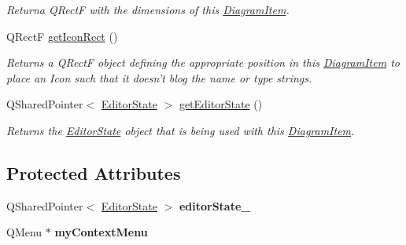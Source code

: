 \begin{DoxyCompactItemize}
\begin{DoxyCompactList}\small\item\em Returna Q\-Rect\-F with the dimensions of this \hyperlink{class_diagram_item}{Diagram\-Item}. \end{DoxyCompactList}\item 
\hypertarget{class_diagram_item_aa1244f4c5fc573505096ce8384580396}{Q\-Rect\-F \hyperlink{class_diagram_item_aa1244f4c5fc573505096ce8384580396}{get\-Icon\-Rect} ()}\label{class_diagram_item_aa1244f4c5fc573505096ce8384580396}

\begin{DoxyCompactList}\small\item\em Returns a Q\-Rect\-F object defining the appropriate position in this \hyperlink{class_diagram_item}{Diagram\-Item} to place an Icon such that it doesn't blog the name or type strings. \end{DoxyCompactList}\item 
\hypertarget{class_diagram_item_afe6a5812a322d49ea7da56bfccdc98dc}{Q\-Shared\-Pointer$<$ \hyperlink{class_editor_state}{Editor\-State} $>$ \hyperlink{class_diagram_item_afe6a5812a322d49ea7da56bfccdc98dc}{get\-Editor\-State} ()}\label{class_diagram_item_afe6a5812a322d49ea7da56bfccdc98dc}

\begin{DoxyCompactList}\small\item\em Returns the \hyperlink{class_editor_state}{Editor\-State} object that is being used with this \hyperlink{class_diagram_item}{Diagram\-Item}. \end{DoxyCompactList}\end{DoxyCompactItemize}
\subsection*{Protected Attributes}
\begin{DoxyCompactItemize}
\item 
\hypertarget{class_diagram_item_ac137f7b1958d323c1ff4d55039b0a04e}{Q\-Shared\-Pointer$<$ \hyperlink{class_editor_state}{Editor\-State} $>$ {\bfseries editor\-State\-\_\-}}\label{class_diagram_item_ac137f7b1958d323c1ff4d55039b0a04e}

\item 
\hypertarget{class_diagram_item_a8ed30c9d92910b41acde1e42498eea3b}{Q\-Menu $\ast$ {\bfseries my\-Context\-Menu}}\label{class_diagram_item_a8ed30c9d92910b41acde1e42498eea3b}

\end{DoxyCompactItemize}


